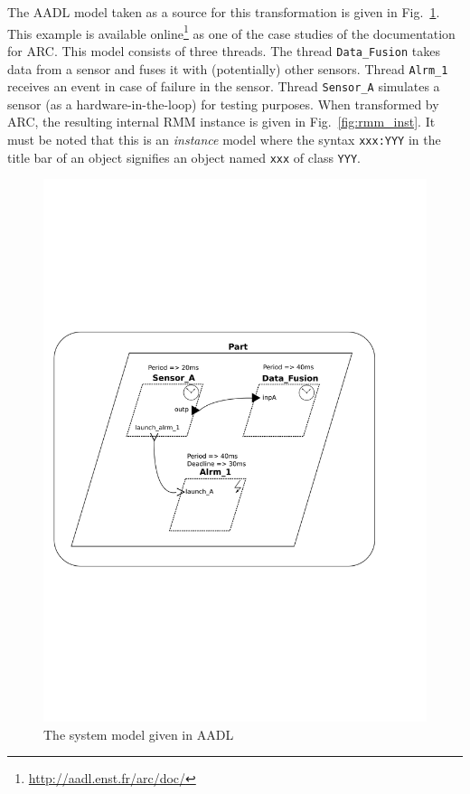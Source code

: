 The AADL model taken as a source for this transformation is given in
Fig.~\ref{fig:example}. This example is available
online\footnote{\url{http://aadl.enst.fr/arc/doc/}} as one of the case
studies of the documentation for ARC. This model consists of three
threads. The thread \texttt{Data\_Fusion} takes data from a sensor and
fuses it with (potentially) other sensors. Thread \texttt{Alrm\_1}
receives an event in case of failure in the sensor. Thread
\texttt{Sensor\_A} simulates a sensor (as a hardware-in-the-loop) for
testing purposes. When transformed by ARC, the resulting internal RMM
instance is given in Fig.~\ref{fig:rmm_inst}. It must be noted that
this is an \emph{instance} model where the syntax \texttt{xxx:YYY} in
the title bar of an object signifies an object named \texttt{xxx} of
class \texttt{YYY}.

\begin{figure}
\centering
\includegraphics[scale=0.60]{figs/example}
\caption{The system model given in AADL}
\label{fig:example}
\end{figure}

